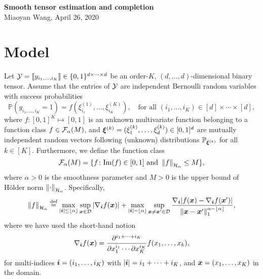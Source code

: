\documentclass[11pt]{article}
\theoremstyle{plain}
\theoremstyle{definition}
\newcommand{\Hnorm}[1]{\left\lVert#1\right\rVert_{\tH_\alpha}}
\begin{document}
\begin{center}
{\bf \Large Smooth tensor estimation and completion}\\
Miaoyan Wang, April 26, 2020
\end{center}
\section{Model}

Let $\mathcal{Y}=\llbracket y_{i_1,\ldots,i_K} \rrbracket\in\{0,1\}^{d \times \cdots \times d}$ be an order-$K$, $(d,\ldots,d)$-dimensional binary tensor. Assume that the entries of $\mathcal{Y}$ are independent Bernoulli random variables with success probabilities
\[
\mathbb{P}\left(y_{i_1,\ldots,i_K}=1\right)=f\left(\xi^{(1)}_{i_1},\ldots,\xi^{(K)}_{i_K}\right),\quad \text{for all } (i_1,\ldots,i_K)\in[d]\times \cdots \times [d],
\]
where $f\colon [0,1]^K\mapsto [0,1]$ is an unknown multivariate function belonging to a function class $f\in \mathcal{F}_\alpha(M)$, and $\boldsymbol{\xi}^{(k)}=(\xi^{(k)}_1,\ldots,\xi^{(k)}_d)\in[0,1]^d$ are mutually independent random vectors following  (unknown) distributions $\mathbb{P}_{\boldsymbol{\xi}^{(k)}}$ for all $k\in[K]$. Furthermore, we define the function class
 \[ 
\tF_\alpha(M)=\{f\colon \text{Im}(f)\in[0,1]\ \text{and}\ \Hnorm{f}\leq M\},
\]
where $\alpha>0$ is the smoothness parameter and $M>0$ is the upper bound of H\"{o}lder norm $\Hnorm{\cdot}$. Specifically, 
\[
\Hnorm{f}\stackrel{\text{def}}{=}\max_{|\mi|\leq \lfloor \alpha \rfloor}\sup_{\mx \in \tD} |\nabla_{\mi} f(\mx)|+\max_{|\mi| =\lfloor \alpha \rfloor}\sup_{\mx\neq \mx' \in \tD} {\nabla_{\mi} |f(\mx)-\nabla_{\mi} f(\mx')|\over \onenorm{\mx-\mx'}^{\alpha-\lfloor \alpha \rfloor}},
\]
where we have used the short-hand notion
\[
 \nabla_{\bm{i}} f(\bm x) ={\partial^{i_1+\cdots+i_K}\over \partial x^{i_1}_1\cdots \partial x^{i_K}_K} f(x_1,\ldots,x_k),
\]
for multi-indices $\bm{i}=(i_1,\ldots,i_K)$ with $|\bm{i}|=i_1+\cdots+i_K$, and $\bm x=(x_1,\ldots,x_K)$ in the domain.


\end{document}
